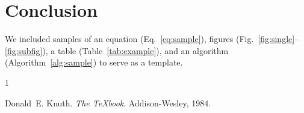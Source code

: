 \documentclass{tmsce}
\begin{document}
\section{Conclusion}
We included samples of an equation (Eq.~\ref{eq:sample}), figures (Fig.~\ref{fig:single}--\ref{fig:subfig}),
a table (Table~\ref{tab:example}), and an algorithm (Algorithm~\ref{alg:sample}) to serve as a template.


\begin{thebibliography}{1}

Donald~E. Knuth.
\newblock \emph{The \TeX book}.
\newblock Addison-Wesley, 1984.

\end{thebibliography}
\end{document}
